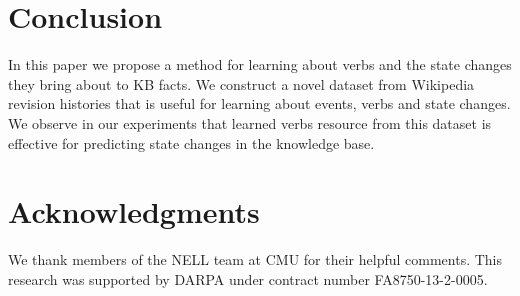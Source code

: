 \section{Conclusion}
In this paper we propose a method for learning about verbs and the state changes they bring about to KB facts. We construct a novel dataset from Wikipedia revision histories that is useful for learning about events, verbs and state changes. We observe in our experiments that learned verbs resource from this dataset is effective for predicting state changes in the knowledge base. 

\section*{Acknowledgments}
We thank members of the NELL team at CMU for their helpful comments.
This research was supported by
DARPA under contract number FA8750-13-2-0005.